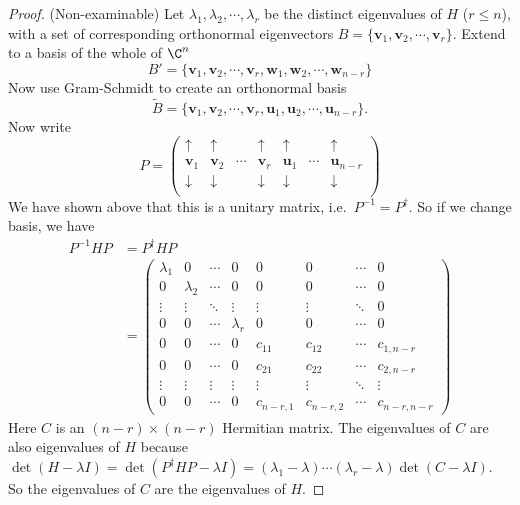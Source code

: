 \documentclass[a4paper]{article}
\begin{document}
\begin{proof}
  (Non-examinable) Let $\lambda_1,\lambda_2, \cdots, \lambda_r$ be the distinct eigenvalues of $H$ ($r \leq n$), with a set of corresponding orthonormal eigenvectors $B = \{\mathbf{v}_1, \mathbf{v}_2, \cdots, \mathbf{v}_r\}$. Extend to a basis of the whole of $\C^n$
  \[
    B' = \{\mathbf{v}_1, \mathbf{v}_2, \cdots, \mathbf{v}_r, \mathbf{w}_1, \mathbf{w}_2,\cdots, \mathbf{w}_{n - r}\}
  \]
  Now use Gram-Schmidt to create an orthonormal basis
  \[
    \tilde{B} = \{\mathbf{v}_1, \mathbf{v}_2, \cdots, \mathbf{v}_r, \mathbf{u}_1, \mathbf{u}_2, \cdots, \mathbf{u}_{n - r}\}.
  \]
  Now write
  \[
    P =
    \begin{pmatrix}
      \uparrow & \uparrow & & \uparrow & \uparrow & & \uparrow\\
      \mathbf{v}_1 & \mathbf{v}_2 & \cdots & \mathbf{v}_r & \mathbf{u}_1 & \cdots & \mathbf{u}_{n - r}\\
      \downarrow & \downarrow & & \downarrow & \downarrow & & \downarrow\\
    \end{pmatrix}
  \]
  We have shown above that this is a unitary matrix, i.e.\ $P^{-1} = P^\dagger$. So if we change basis, we have
  \begin{align*}
    P^{-1}HP &= P^\dagger HP\\
    &= \begin{pmatrix}
      \lambda_1 & 0 & \cdots & 0 & 0 & 0 & \cdots & 0\\
      0 & \lambda_2 & \cdots & 0 & 0 & 0 & \cdots & 0\\
      \vdots & \vdots & \ddots & \vdots & \vdots & \vdots & \ddots & 0\\
      0 & 0 & \cdots & \lambda_r & 0 & 0 & \cdots & 0\\
      0 & 0 & \cdots & 0 & c_{11} & c_{12} & \cdots & c_{1, n - r}\\
      0 & 0 & \cdots & 0 & c_{21} & c_{22} & \cdots & c_{2, n - r}\\
      \vdots & \vdots & \vdots & \vdots & \vdots & \vdots & \ddots & \vdots \\
      0 & 0 & \cdots & 0 & c_{n - r,1} & c_{n - r,2} & \cdots & c_{n - r, n - r}
    \end{pmatrix}
  \end{align*}
  Here $C$ is an $(n - r)\times (n - r)$ Hermitian matrix. The eigenvalues of $C$ are also eigenvalues of $H$ because $\det (H - \lambda I) = \det(P^\dagger HP - \lambda I) = (\lambda_1 - \lambda)\cdots (\lambda_r - \lambda)\det (C - \lambda I)$. So the eigenvalues of $C$ are the eigenvalues of $H$.


\end{proof}
\end{document}
